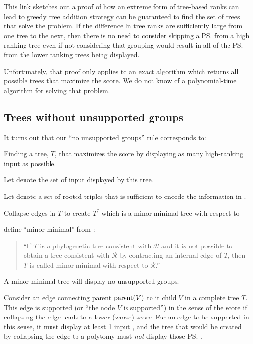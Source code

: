 \documentclass[11pt]{article}
\begin{document}
\href{https://github.com/OpenTreeOfLife/treemachine/wiki/MaxWeightOfInputTreeEdgesDisplayed}{This link}
    sketches out a proof of how an extreme form of tree-based ranks
    can lead to greedy tree addition strategy can be guaranteed to 
    find the set of trees that solve the \MSWIPSD problem.
If the difference in tree ranks are sufficiently large from one tree to the next,
    then there is no need to consider skipping a \ps from a high ranking tree
    even if not considering that grouping would result in all of the \ps
    from the lower ranking trees being displayed.

Unfortunately, that proof only applies to an exact algorithm which returns
    all possible trees that maximize the score.
We do not know of a polynomial-time algorithm for solving that problem.

\subsection{Trees without unsupported groups}\label{unsupportedTheory}
It turns out that our ``no unsupported groups'' rule corresponds to:
\begin{compactenum}
    \item Finding a tree, $T$, that maximizes the score by displaying as many high-ranking input \pss as possible.
    \item Let \pssInOptimalTree denote the set of input \pss displayed by this tree.
    \item Let \tripleSetInOptimal denote a set of rooted triples that is sufficient to encode the information in \pssInOptimalTree.
    \item Collapse edges in $T$ to create $T^{\ast}$ which is a minor-minimal tree with respect to \tripleSetInOptimal
\end{compactenum}
\citet{JanssonLL2012} define ``minor-minimal'' from \citet{Semple2003}:
\begin{quote}
``If $T$ is a phylogenetic tree consistent with $\mathcal{R}$ and it is not possible to obtain a tree consistent with $\mathcal{R}$ by contracting an internal edge of $T$, then $T$ is called minor-minimal with respect to $\mathcal{R}$.''
\end{quote}
A minor-minimal tree will display no unsupported groups.


Consider an edge connecting parent $\mbox{parent}(V)$ to it child $V$ in a complete tree $T$.
This edge is supported (or ``the node $V$ is supported'') in the sense of the \MSWIPSD score if
    collapsing the edge leads to a lower (worse) score.
For an edge to be supported in this sense, it must display at least 1 input \pss, and
    the tree that would be created by collapsing the edge to a polytomy must
    {\em not} display those \ps.
\end{document}
